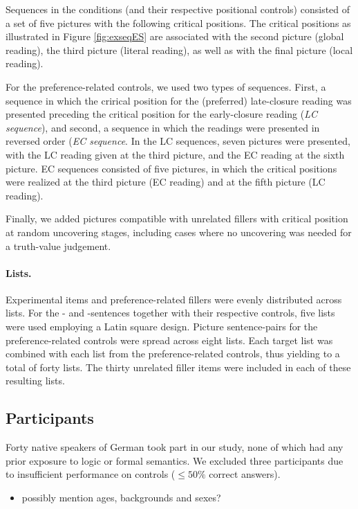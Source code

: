 \documentclass[fleqn,reqno,10pt,draft]{article}
\newcommand{\as}{\acro{as}}
\renewcommand{\es}{\acro{es}}
\begin{document}
Sequences in the \es conditions (and their respective positional
controls) consisted of a set of five pictures with the following
critical positions. The critical positions as illustrated in Figure
\ref{fig:exseqES} are associated with the second picture (global
reading), the third picture (literal reading), as well as with the
final picture (local reading).

For the preference-related controls, we used two types of
sequences. First, a sequence in which the crirical position for the
(preferred) late-closure reading was presented preceding the critical
position for the early-closure reading ({\it LC sequence}), and
second, a sequence in which the readings were presented in reversed
order ({\it EC sequence}. In the LC sequences, seven pictures were
presented, with the LC reading given at the third picture, and the EC
reading at the sixth picture. EC sequences consisted of five pictures,
in which the critical positions were realized at the third picture (EC
reading) and at the fifth picture (LC reading).

Finally, we added pictures compatible with unrelated fillers with
critical position at random uncovering stages, including cases where
no uncovering was needed for a truth-value judgement.

\paragraph{Lists.}
Experimental items and preference-related fillers were evenly
distributed across lists. For the \as- and \es-sentences together with
their respective controls, five lists were used employing a Latin
square design. Picture sentence-pairs for the preference-related
controls were spread across eight lists. Each target list was combined
with each list from the preference-related controls, thus yielding to
a total of forty lists. The thirty unrelated filler items were
included in each of these resulting lists.


\subsection{Participants}
\label{sec:participants} 

Forty native speakers of German took part in our study, none of which had
any prior exposure to logic or formal semantics. We excluded three
participants due to insufficient performance on controls ($\le 50\%$
correct answers).  

\begin{itemize}
\item possibly mention ages, backgrounds and sexes?
\end{itemize}
\end{document}
